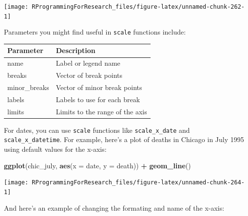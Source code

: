 \documentclass[]{book}
\makeatletter
\newenvironment{Shaded}{\begin{snugshade}}{\end{snugshade}}
\newcommand{\KeywordTok}[1]{\textcolor[rgb]{0.13,0.29,0.53}{\textbf{#1}}}
\newcommand{\DataTypeTok}[1]{\textcolor[rgb]{0.13,0.29,0.53}{#1}}
\newcommand{\StringTok}[1]{\textcolor[rgb]{0.31,0.60,0.02}{#1}}
\newcommand{\OperatorTok}[1]{\textcolor[rgb]{0.81,0.36,0.00}{\textbf{#1}}}
\newcommand{\NormalTok}[1]{#1}
\newenvironment{kframe}{%
\medskip{}
\setlength{\fboxsep}{.8em}
 \def\at@end@of@kframe{}%
 \ifinner\ifhmode%
  \def\at@end@of@kframe{\end{minipage}}%
  \begin{minipage}{\columnwidth}%
 \fi\fi%
 \def\FrameCommand##1{\hskip\@totalleftmargin \hskip-\fboxsep
 \colorbox{shadecolor}{##1}\hskip-\fboxsep
     \hskip-\linewidth \hskip-\@totalleftmargin \hskip\columnwidth}%
 \MakeFramed {\advance\hsize-\width
   \@totalleftmargin\z@ \linewidth\hsize
   \@setminipage}}%
 {\par\unskip\endMakeFramed%
 \at@end@of@kframe}
\renewenvironment{Shaded}{\begin{kframe}}{\end{kframe}}
\theoremstyle{definition}
\theoremstyle{definition}
\theoremstyle{definition}
\theoremstyle{remark}
\makeatother
\begin{document}
\begin{center}\texttt{[image: RProgrammingForResearch\_files/figure-latex/unnamed-chunk-262-1]} \end{center}

Parameters you might find useful in \texttt{scale} functions include:

\begin{tabular}{l|l}
\hline
Parameter & Description\\
\hline
name & Label or legend name\\
\hline
breaks & Vector of break points\\
\hline
minor\_breaks & Vector of minor break points\\
\hline
labels & Labels to use for each break\\
\hline
limits & Limits to the range of the axis\\
\hline
\end{tabular}

For dates, you can use \texttt{scale} functions like
\texttt{scale\_x\_date} and \texttt{scale\_x\_datetime}. For example,
here's a plot of deaths in Chicago in July 1995 using default values for
the x-axis:

\begin{Shaded}
\begin{Highlighting}[]
\KeywordTok{ggplot}\NormalTok{(chic_july, }\KeywordTok{aes}\NormalTok{(}\DataTypeTok{x =}\NormalTok{ date, }\DataTypeTok{y =}\NormalTok{ death)) }\OperatorTok{+}\StringTok{ }
\StringTok{  }\KeywordTok{geom_line}\NormalTok{() }
\end{Highlighting}
\end{Shaded}

\begin{center}\texttt{[image: RProgrammingForResearch\_files/figure-latex/unnamed-chunk-264-1]} \end{center}

And here's an example of changing the formating and name of the x-axis:

\begin{Shaded}
\end{Shaded}
\end{document}

